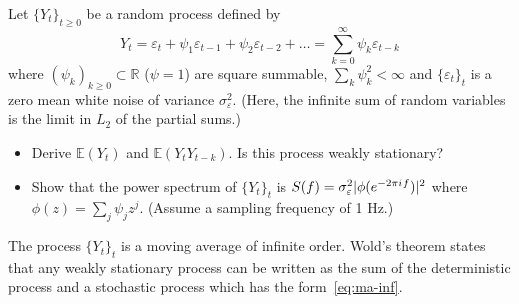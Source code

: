 \documentclass[11pt]{article}
\begin{document}
\begin{exercise}[subtitle=Infinite order moving average MA($\infty$)]
Let $\{Y_t\}_{t\geq 0}$ be a random process defined by
\begin{equation}\label{eq:ma-inf}
    Y_t = \varepsilon_t + \psi_1 \varepsilon_{t-1} + \psi_2 \varepsilon_{t-2} + \dots = \sum_{k=0}^{\infty} \psi_k\varepsilon_{t-k}
\end{equation}
where $(\psi_k)_{k\geq0} \subset \mathbb{R}$ ($\psi=1$) are square summable, \ie $\sum_k \psi_k^2 < \infty$ and $\{\varepsilon_t\}_t$ is a zero mean white noise of variance $\sigma_\varepsilon^2$.
(Here, the infinite sum of random variables is the limit in $L_2$ of the partial sums.)
\begin{itemize}
    \item Derive $\mathbb{E}(Y_t)$ and $\mathbb{E}(Y_t Y_{t-k})$. Is this process weakly stationary?
    \item Show that the power spectrum of $\{Y_t\}_{t}$ is $S(f) = \sigma_\varepsilon^2 |\phi(e^{-2\pi{i\mkern1mu} f})|^2$ where $\phi(z) = \sum_j \psi_j z^j$. (Assume a sampling frequency of 1 Hz.)
\end{itemize}

The process $\{Y_t\}_{t}$ is a moving average of infinite order.
Wold's theorem states that any weakly stationary process can be written as the sum of the deterministic process and a stochastic process which has the form~\eqref{eq:ma-inf}.

\end{exercise}

\begin{solution}  %

\end{solution}
\end{document}
